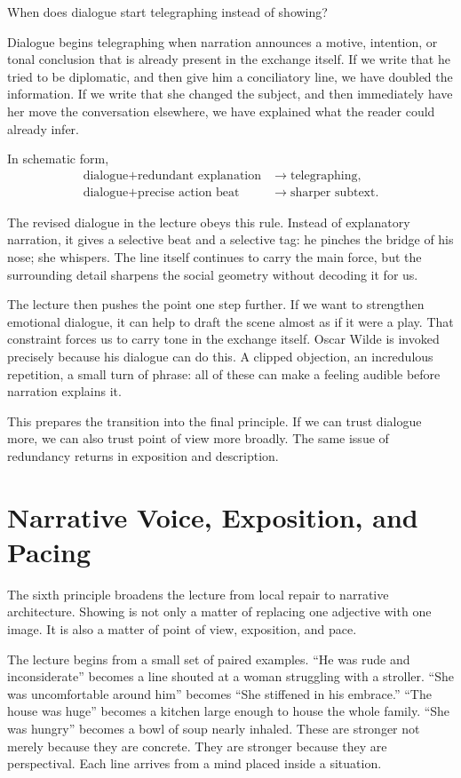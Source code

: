 When does dialogue start telegraphing instead of showing?

Dialogue begins telegraphing when narration announces a motive, intention, or tonal conclusion that is already present in the exchange itself. If we write that he tried to be diplomatic, and then give him a conciliatory line, we have doubled the information. If we write that she changed the subject, and then immediately have her move the conversation elsewhere, we have explained what the reader could already infer.

In schematic form,
\begin{align}
\text{dialogue} + \text{redundant explanation}
&\to \text{telegraphing},\\
\text{dialogue} + \text{precise action beat}
&\to \text{sharper subtext}.
\end{align}

The revised dialogue in the lecture obeys this rule. Instead of explanatory narration, it gives a selective beat and a selective tag: he pinches the bridge of his nose; she whispers. The line itself continues to carry the main force, but the surrounding detail sharpens the social geometry without decoding it for us.

The lecture then pushes the point one step further. If we want to strengthen emotional dialogue, it can help to draft the scene almost as if it were a play. That constraint forces us to carry tone in the exchange itself. Oscar Wilde is invoked precisely because his dialogue can do this. A clipped objection, an incredulous repetition, a small turn of phrase: all of these can make a feeling audible before narration explains it.

This prepares the transition into the final principle. If we can trust dialogue more, we can also trust point of view more broadly. The same issue of redundancy returns in exposition and description.

\section{Narrative Voice, Exposition, and Pacing}

The sixth principle broadens the lecture from local repair to narrative architecture. Showing is not only a matter of replacing one adjective with one image. It is also a matter of point of view, exposition, and pace.

The lecture begins from a small set of paired examples. ``He was rude and inconsiderate'' becomes a line shouted at a woman struggling with a stroller. ``She was uncomfortable around him'' becomes ``She stiffened in his embrace.'' ``The house was huge'' becomes a kitchen large enough to house the whole family. ``She was hungry'' becomes a bowl of soup nearly inhaled. These are stronger not merely because they are concrete. They are stronger because they are perspectival. Each line arrives from a mind placed inside a situation.

